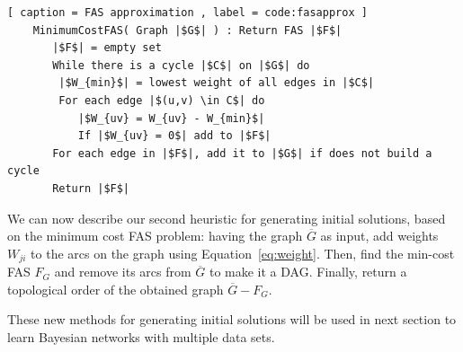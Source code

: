 \begin{lstlisting}[ caption = FAS approximation , label = code:fasapprox ]
	MinimumCostFAS( Graph |$G$| ) : Return FAS |$F$|
	   |$F$| = empty set
	   While there is a cycle |$C$| on |$G$| do
	   	|$W_{min}$| = lowest weight of all edges in |$C$|
		For each edge |$(u,v) \in C$| do
		   |$W_{uv} = W_{uv} - W_{min}$|
		   If |$W_{uv} = 0$| add to |$F$|
	   For each edge in |$F$|, add it to |$G$| if does not build a cycle
	   Return |$F$|
\end{lstlisting}

%
We can now describe our second heuristic for generating initial solutions, based on the minimum cost FAS problem: having the graph $\overline G$ as input, add weights $W_{ji}$ to the arcs on the graph using Equation~\ref{eq:weight}. Then, find the min-cost FAS $F_G$ and remove its arcs from $\overline G$ to make it a DAG. Finally, return a topological order of the obtained graph $\overline G - F_G$.

These new methods for generating initial solutions will be used in next section to learn Bayesian networks with multiple data sets.